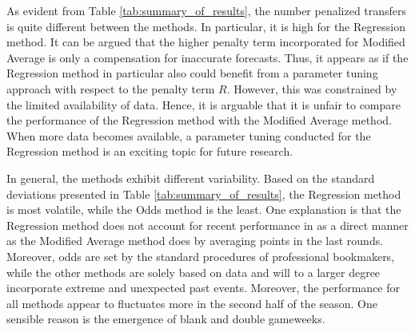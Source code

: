 
\newpar

As evident from Table \ref{tab:summary_of_results}, the number penalized transfers is quite different between the methods. In particular, it is high for the Regression method. It can be argued that the higher penalty term incorporated for Modified Average is only a compensation for inaccurate forecasts. Thus, it appears as if the Regression method in particular also could benefit from a parameter tuning approach with respect to the penalty term $R$. However, this was constrained by the limited availability of data. Hence, it is arguable that it is unfair to compare the performance of the Regression method with the Modified Average method. When more data becomes available, a parameter tuning conducted for the Regression method is an exciting topic for future research.

\newpar 

In general, the methods exhibit different variability. Based on the standard deviations presented in Table \ref{tab:summary_of_results}, the Regression method is most volatile, while the Odds method is the least. One explanation is that the Regression method does not account for recent performance in as a direct manner as the Modified Average method does by averaging points in the last rounds. Moreover, odds are set by the standard procedures of professional bookmakers, while the other methods are solely based on data and will to a larger degree incorporate extreme and unexpected past events. Moreover, the performance for all methods appear to fluctuates more in the second half of the season. One sensible reason is the emergence of blank and double gameweeks. 

\newpar

